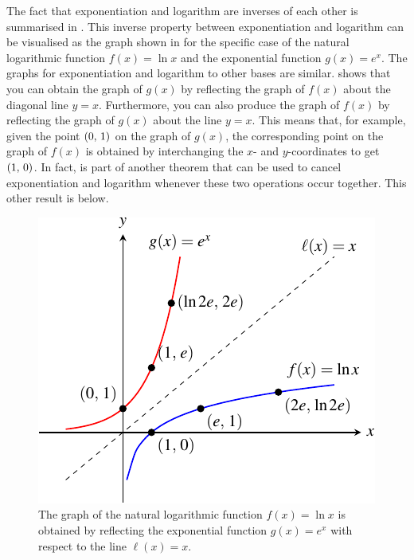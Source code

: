 \documentclass[a4paper,oneside,12pt]{article}
\begin{document}
The fact that exponentiation and logarithm are inverses of each other
is summarised in .  This
inverse property between exponentiation and logarithm can be
visualised as the graph shown in
for the specific case of the natural logarithmic function
$f(x) = \ln x$ and the exponential function $g(x) = e^x$.  The graphs
for exponentiation and logarithm to other bases are similar.
shows that you can obtain the graph of $g(x)$ by reflecting the graph
of $f(x)$ about the diagonal line $y = x$.  Furthermore, you can also
produce the graph of $f(x)$ by reflecting the graph of $g(x)$ about
the line $y = x$.  This means that, for example, given the point
$\left\lparen{0},\, {1}\right\rparen$ on the graph of $g(x)$, the corresponding point on the
graph of $f(x)$ is obtained by interchanging the $x$- and
$y$-coordinates to get $\left\lparen{1},\, {0}\right\rparen$.  In fact,
 is part of another theorem
that can be used to cancel exponentiation and logarithm whenever these
two operations occur together.  This other result is
 below.

\begin{figure}[!htbp]
\centering
\includegraphics[scale=1.2]{image/12/inverses.pdf}
\caption{%
  The graph of the natural logarithmic function $f(x) = \ln x$ is
  obtained by reflecting the exponential function $g(x) = e^x$ with
  respect to the line $\ell(x) = x$.
}
\label{fig:logarithmic_function_reflection_of_exponential_function}
\end{figure}
\end{document}

